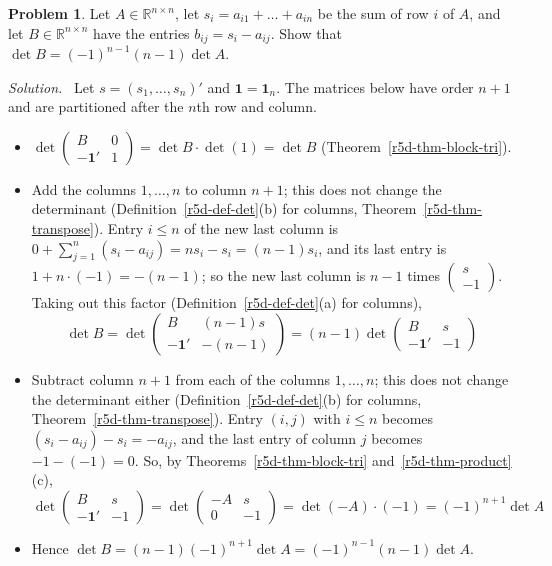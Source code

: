 \documentclass[12pt]{article}
\newcommand{\R}{\mathbb R}
\newcommand{\one}{\mathbf 1}
\theoremstyle{definition}
\newtheorem{problem}{Problem}
\newenvironment{solution}{\par\noindent\textit{Solution.}\ }{\par\smallskip}
\begin{document}
\begin{problem}\label{r5d-ex-pr-row-sums}
Let \(A\in\R^{n\times n}\), let \(s_i=a_{i1}+\dots+a_{in}\) be the sum of row \(i\) of \(A\), and let \(B\in\R^{n\times n}\)
have the entries \(b_{ij}=s_i-a_{ij}\). Show that \(\det B=(-1)^{n-1}(n-1)\det A\).
\end{problem}
\begin{solution}
Let \(s=(s_1,\dots,s_n)'\) and \(\one=\one_n\). The matrices below have order \(n+1\) and are partitioned after the \(n\)th
row and column.
\begin{itemize}
\item \(\det\left(\begin{smallmatrix}B&0\\-\one'&1\end{smallmatrix}\right)=\det B\cdot\det(1)=\det B\)
(Theorem~\ref{r5d-thm-block-tri}).
\item Add the columns \(1,\dots,n\) to column \(n+1\); this does not change the determinant
(Definition~\ref{r5d-def-det}(b) for columns, Theorem~\ref{r5d-thm-transpose}). Entry \(i\leqslant n\) of the new last column
is \(0+\sum_{j=1}^n(s_i-a_{ij})=ns_i-s_i=(n-1)s_i\), and its last entry is \(1+n\cdot(-1)=-(n-1)\); so the new last column is
\(n-1\) times \(\left(\begin{smallmatrix}s\\-1\end{smallmatrix}\right)\). Taking out this factor
(Definition~\ref{r5d-def-det}(a) for columns),
\[
\det B=\det\begin{pmatrix}B&(n-1)s\\-\one'&-(n-1)\end{pmatrix}=(n-1)\det\begin{pmatrix}B&s\\-\one'&-1\end{pmatrix}
\]
\item Subtract column \(n+1\) from each of the columns \(1,\dots,n\); this does not change the determinant either
(Definition~\ref{r5d-def-det}(b) for columns, Theorem~\ref{r5d-thm-transpose}). Entry \((i,j)\) with \(i\leqslant n\) becomes
\((s_i-a_{ij})-s_i=-a_{ij}\), and the last entry of column \(j\) becomes \(-1-(-1)=0\). So, by
Theorems~\ref{r5d-thm-block-tri} and~\ref{r5d-thm-product}(c),
\[
\det\begin{pmatrix}B&s\\-\one'&-1\end{pmatrix}=\det\begin{pmatrix}-A&s\\0&-1\end{pmatrix}=\det(-A)\cdot(-1)
=(-1)^{n+1}\det A
\]
\item Hence \(\det B=(n-1)(-1)^{n+1}\det A=(-1)^{n-1}(n-1)\det A\).
\end{itemize}
\end{solution}
\end{document}
